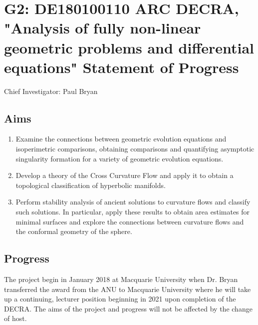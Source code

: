 \documentclass[12pt]{article}
\author{Paul Bryan}
\date{}
\title{}
\begin{document}
\section*{G2: DE180100110 ARC DECRA, "Analysis of fully non-linear geometric problems and differential equations" Statement of Progress}
\label{sec:orgheadline3}

Chief Investigator: Paul Bryan

\subsection*{Aims}
\label{sec:orgheadline1}

\begin{enumerate}
\item Examine the connections between geometric evolution equations and isoperimetric comparisons, obtaining comparisons and quantifying asymptotic singularity formation for a variety of geometric evolution equations.

\item Develop a theory of the Cross Curvature Flow and apply it to obtain a topological classification of hyperbolic manifolds.

\item Perform stability analysis of ancient solutions to curvature flows and classify such solutions. In particular, apply these results to obtain area estimates for minimal surfaces and explore the connections between curvature flows and the conformal geometry of the sphere.
\end{enumerate}

\subsection*{Progress}
\label{sec:orgheadline2}

The project begin in January 2018 at Macquarie University when Dr. Bryan transferred the award from the ANU to Macquarie University where he will take up a continuing, lecturer position beginning in 2021 upon completion of the DECRA. The aims of the project and progress will not be affected by the change of host.
\end{document}
